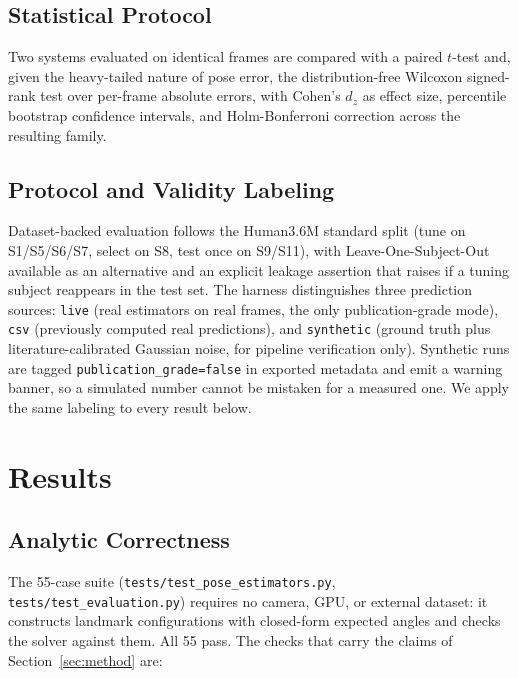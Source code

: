 \documentclass[conference]{IEEEtran}
\begin{document}
\subsection{Statistical Protocol}
Two systems evaluated on identical frames are compared with a paired
$t$-test and, given the heavy-tailed nature of pose error, the
distribution-free Wilcoxon signed-rank test over per-frame absolute
errors, with Cohen's $d_z$ as effect size, percentile bootstrap
confidence intervals, and Holm-Bonferroni correction across the resulting
family.

\subsection{Protocol and Validity Labeling}
Dataset-backed evaluation follows the Human3.6M standard split (tune on
S1/S5/S6/S7, select on S8, test once on S9/S11), with Leave-One-Subject-Out
available as an alternative and an explicit leakage assertion that raises
if a tuning subject reappears in the test set. The harness distinguishes
three prediction sources: \texttt{live} (real estimators on real frames,
the only publication-grade mode), \texttt{csv} (previously computed real
predictions), and \texttt{synthetic} (ground truth plus
literature-calibrated Gaussian noise, for pipeline verification only).
Synthetic runs are tagged \texttt{publication\_grade=false} in exported
metadata and emit a warning banner, so a simulated number cannot be
mistaken for a measured one. We apply the same labeling to every result
below.

\section{Results}
\label{sec:results}

\subsection{Analytic Correctness}
\label{sec:results-analytic}
The 55-case suite (\texttt{tests/test\_pose\_estimators.py},
\texttt{tests/test\_evaluation.py}) requires no camera, GPU, or external
dataset: it constructs landmark configurations with closed-form expected
angles and checks the solver against them. All 55 pass. The checks that
carry the claims of Section~\ref{sec:method} are:
\end{document}
